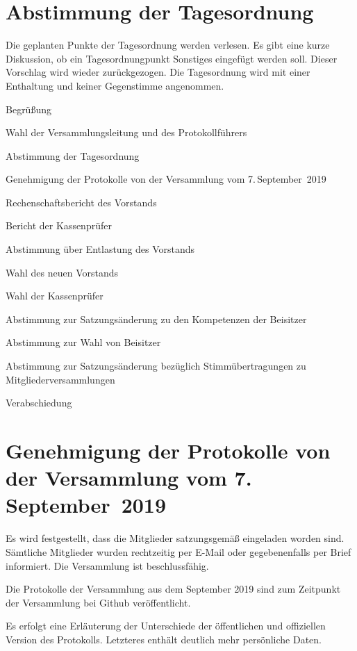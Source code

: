 \documentclass[DIV=calc,parksip=half*]{scrartcl}
\begin{document}
\section{Abstimmung der Tagesordnung}
Die geplanten Punkte der Tagesordnung werden verlesen. Es gibt eine kurze Diskussion, ob ein Tagesordnungpunkt Sonstiges eingefügt werden soll. Dieser Vorschlag wird wieder zurückgezogen. Die Tagesordnung wird mit einer Enthaltung und keiner Gegenstimme angenommen.
\begin{compactenum}
\item Begrüßung
\item Wahl der Versammlungsleitung und des Protokollführers
\item Abstimmung der Tagesordnung
\item  Genehmigung der Protokolle von der Versammlung vom 7.\,September~2019
\item  Rechenschaftsbericht des Vorstands
\item  Bericht der Kassenprüfer
\item Abstimmung über Entlastung des Vorstands
\item Wahl des neuen Vorstands
\item Wahl der Kassenprüfer
\item Abstimmung zur Satzungsänderung zu den Kompetenzen der Beisitzer
\item Abstimmung zur Wahl von Beisitzer
\item Abstimmung zur Satzungsänderung bezüglich Stimmübertragungen zu Mitgliederversammlungen
\item Verabschiedung
\end{compactenum}


\section{Genehmigung der Protokolle von der Versammlung vom 7.\,September~2019}


Es wird festgestellt, dass die Mitglieder satzungsgemäß eingeladen worden
sind. Sämtliche Mitglieder wurden rechtzeitig per E-Mail oder gegebenenfalls per
Brief informiert.  Die Versammlung ist beschlussfähig.

Die Protokolle der Versammlung aus dem September 2019 sind zum Zeitpunkt der
Versammlung bei Github veröffentlicht. 

Es erfolgt eine Erläuterung der Unterschiede der öffentlichen und offiziellen Version des Protokolls. Letzteres enthält deutlich mehr persönliche Daten.
\end{document}
